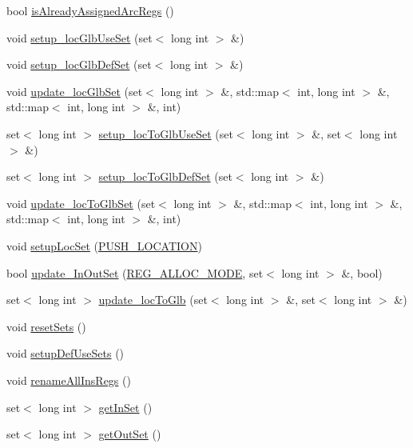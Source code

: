 \begin{DoxyCompactItemize}
\item 
bool \hyperlink{classinstruction_ab5e9dd71fbc48781b528341a9a371a95}{isAlreadyAssignedArcRegs} ()
\item 
void \hyperlink{classinstruction_a7c5699deabae9d06e77ca5f9a6368e1b}{setup\_\-locGlbUseSet} (set$<$ long int $>$ \&)
\item 
void \hyperlink{classinstruction_ab4d650144a6a91370a440977b6c67a9a}{setup\_\-locGlbDefSet} (set$<$ long int $>$ \&)
\item 
void \hyperlink{classinstruction_a33901636d2350a413a4d245f6d16e6a6}{update\_\-locGlbSet} (set$<$ long int $>$ \&, std::map$<$ int, long int $>$ \&, std::map$<$ int, long int $>$ \&, int)
\item 
set$<$ long int $>$ \hyperlink{classinstruction_ae25624ad14ee474a22819a8831732ec6}{setup\_\-locToGlbUseSet} (set$<$ long int $>$ \&, set$<$ long int $>$ \&)
\item 
set$<$ long int $>$ \hyperlink{classinstruction_a057247b6632a4fa3eb672d7b7bcb85b1}{setup\_\-locToGlbDefSet} (set$<$ long int $>$ \&)
\item 
void \hyperlink{classinstruction_a8c177bf836da2d16fca731375b07fc35}{update\_\-locToGlbSet} (set$<$ long int $>$ \&, std::map$<$ int, long int $>$ \&, std::map$<$ int, long int $>$ \&, int)
\item 
void \hyperlink{classinstruction_af50b9f329ee94315d1fbff3a151cbd45}{setupLocSet} (\hyperlink{binaryTranslator_2global_8h_ae3190c0c46d1384e80f94a61ad275092}{PUSH\_\-LOCATION})
\item 
bool \hyperlink{classinstruction_a173a23e5f292232055dec69475b3fd92}{update\_\-InOutSet} (\hyperlink{binaryTranslator_2global_8h_a78dd04e0a4364ff551d83095f9bc0264}{REG\_\-ALLOC\_\-MODE}, set$<$ long int $>$ \&, bool)
\item 
set$<$ long int $>$ \hyperlink{classinstruction_aaba4ffcf984873d13a0ecea71a0ebad3}{update\_\-locToGlb} (set$<$ long int $>$ \&, set$<$ long int $>$ \&)
\item 
void \hyperlink{classinstruction_a7c577242cd5b190a00a9f433222b8e0b}{resetSets} ()
\item 
void \hyperlink{classinstruction_ad8aba4b11bc32a8e52866c79c8dc47e6}{setupDefUseSets} ()
\item 
void \hyperlink{classinstruction_aac67c9bd51efdf37963fbfc5da8fb737}{renameAllInsRegs} ()
\item 
set$<$ long int $>$ \hyperlink{classinstruction_ab9bf2478b915e5b209d671afd85f0519}{getInSet} ()
\item 
set$<$ long int $>$ \hyperlink{classinstruction_adf7cb55183c08b9f5a04d798847e2564}{getOutSet} ()

\end{DoxyCompactItemize}
